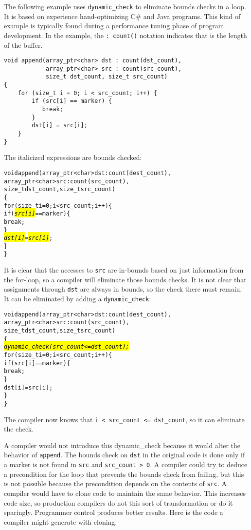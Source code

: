 The following example uses \texttt{dynamic\_check} to eliminate bounds
checks in a loop. It is based on experience hand-optimizing C\# and Java
programs. This kind of example is typically found during a performance
tuning phase of program development. In the example, 
the \verb|: count(|\verb|)| notation indicates that  is the
length of the buffer.

\begin{verbatim}
void append(array_ptr<char> dst : count(dst_count),
            array_ptr<char> src : count(src_count), 
            size_t dst_count, size_t src_count)
{ 
    for (size_t i = 0; i < src_count; i++) {
        if (src[i] == marker) {
           break;
        }
        dst[i] = src[i];
    }
}
\end{verbatim}

The italicized expressions are bounds checked:
\begin{alltt}
void append(array\_ptr<char> dst: count(dest\_count), 
            array\_ptr<char> src : count(src\_count), 
            size\_t dst\_count, size\_t src\_count)
\{ 
    for (size\_t i = 0; i < src\_count; i++) \{
        if (\hl{\textit{src[i]}} == marker) \{
           break;
        \}
        \hl{\textit{dst[i]}} = \hl{\textit{src[i]}};
    \}
\}
\end{alltt}

It is clear that the accesses to \texttt{src} are in-bounds based on
just information from the for-loop, so a compiler will eliminate those
bounds checks. It is not clear that assignments through \texttt{dst} are
always in bounds, so the check there must remain. It can be eliminated
by adding a \texttt{dynamic\_check}:

\begin{alltt}
void append(array\_ptr<char> dst: count(dest\_count), 
            array\_ptr<char> src : count(src\_count), 
            size\_t dst\_count, size\_t src\_count)
\{ 
    \hl{\textit{dynamic\_check(src\_count <= dst\_count);}}
    for (size\_t i = 0; i < src\_count; i++) \{
        if (src[i] == marker) \{
            break;
        \}
        dst[i] = src[i];
    \}
\}
\end{alltt}

The compiler now knows that \texttt{i < src\_count
<= dst\_count}, so it can eliminate the check.

A compiler would not introduce this dynamic\_check because it would
alter the behavior of \texttt{append}. The bounds check on \texttt{dst}
in the original code is done only if a marker is not found in
\texttt{src} and \texttt{src\_count \textgreater{} 0}. A compiler could
try to deduce a precondition for the loop 
that prevents the bounds check from failing, but this is
not possible because the precondition depends on the contents of
\texttt{src}. A compiler would have to clone code to maintain the same
behavior. This increases code size, so production compilers do not this
sort of transformation or do it sparingly. Programmer control produces
better results.   Here is the code a compiler might generate with cloning.

